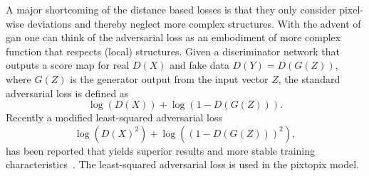 A major shortcoming of the distance based losses is that they only consider
pixel-wise deviations and thereby neglect more complex structures. With the
advent of \gls{gan} one can think of the adversarial loss as an embodiment of
more complex function that respects (local) structures. Given a discriminator
network that outputs a score map for real $D(X)$ and fake data $D(Y)=D(G(Z))$,
where $G(Z)$ is the generator output from the input vector $Z$, the
standard adversarial loss is defined as
\begin{equation}
  \log(D(X))+\log(1-D(G(Z)))
  \label{eq:adv:minmax}.
\end{equation}
Recently a modified least-squared adversarial loss
\begin{equation}
  \log{\left(D{(X)}^2\right)}+\log{\left({(1-D{\left(G{(Z)}\right)})}^2\right)}
  \label{eq:adv:lsquare},
\end{equation}
has been reported that yields superior results and more stable training
characteristics~\cite{Mao2016}. The least-squared adversarial loss is used
in the pixtopix model.
